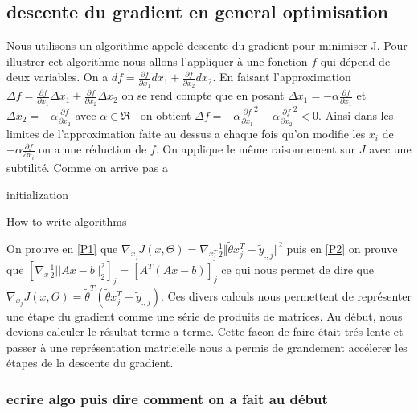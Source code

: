 \documentclass[a4paper,10pt]{article}
\begin{document}
\subsection{descente du gradient en general optimisation}
Nous utilisons un algorithme appelé descente du gradient pour minimiser J. Pour illustrer cet algorithme nous allons l'appliquer 
à une fonction $f$ qui dépend de deux variables.%
 On a $df = \frac{\partial f}{\partial x_{1}}d x_{1} + \frac{\partial f}{\partial x_{2}}dx_{2}$. En faisant l'approximation
 $\Delta f = \frac{\partial f}{\partial x_{1}}\Delta  x_{1} + \frac{\partial f}{\partial x_{2}}\Delta x_{2}$ on se rend compte
 que en posant $\Delta x_{1} = -\alpha \frac{\partial f}{\partial x_{1}}$
 et $\Delta x_{2} = -\alpha \frac{\partial f}{\partial x_{2}}$ avec $\alpha \in \Re^{+}$
 on obtient $\Delta f = -\alpha \frac{\partial f}{\partial x_{1}}^{2} - \alpha \frac{\partial f}{\partial x_{2}}^{2} < 0$. Ainsi dans
 les limites de l'approximation faite au dessus a chaque fois qu'on modifie les $x_{i}$ de $- \alpha \frac{\partial f}{\partial x_{i}}$
 on a une réduction de $f$.
On applique le même raisonnement sur $J$ avec une subtilité. Comme on arrive pas a 

\begin{algorithm}[H]
 initialization\;
 \caption{How to write algorithms}
\end{algorithm}
On prouve en \ref{P1} que $ \nabla_{x_{j}}J(x, \Theta) = \nabla_{x_{j}^T}\frac{1}{2}\Vert\tilde{\theta}x_{j}^{T}-\tilde{y}_{.,j}\Vert^{2}$
puis en \ref{P2} on prouve que $[\nabla_{x} \frac{1}{2}||Ax - b||^{2}_{2}]_{j} = [A^{T}(Ax - b)]_{j}$ ce qui nous permet de dire
que $ \nabla_{x_{j}}J(x, \Theta) =  \tilde{\theta}^{T}(\tilde{\theta}x_{j}^{T}-\tilde{y}_{.,j})$. Ces divers calculs nous permettent
de représenter une étape du gradient comme une série de produits de matrices. Au début, nous devions calculer le résultat terme a terme. Cette
facon de faire était trés lente et passer à une représentation matricielle nous a permis de grandement accélerer les étapes de la descente du gradient.
\subsubsection{ecrire algo puis dire comment on a fait au début}
\end{document}
